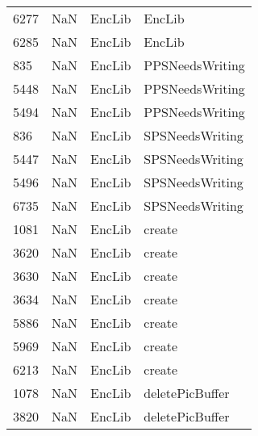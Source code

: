 \begin{tabular}{llll}
6277 &                   NaN &                     EncLib &                                    EncLib \\
6285 &                   NaN &                     EncLib &                                    EncLib \\
835  &                   NaN &                     EncLib &                           PPSNeedsWriting \\
5448 &                   NaN &                     EncLib &                           PPSNeedsWriting \\
5494 &                   NaN &                     EncLib &                           PPSNeedsWriting \\
836  &                   NaN &                     EncLib &                           SPSNeedsWriting \\
5447 &                   NaN &                     EncLib &                           SPSNeedsWriting \\
5496 &                   NaN &                     EncLib &                           SPSNeedsWriting \\
6735 &                   NaN &                     EncLib &                           SPSNeedsWriting \\
1081 &                   NaN &                     EncLib &                                    create \\
3620 &                   NaN &                     EncLib &                                    create \\
3630 &                   NaN &                     EncLib &                                    create \\
3634 &                   NaN &                     EncLib &                                    create \\
5886 &                   NaN &                     EncLib &                                    create \\
5969 &                   NaN &                     EncLib &                                    create \\
6213 &                   NaN &                     EncLib &                                    create \\
1078 &                   NaN &                     EncLib &                           deletePicBuffer \\
3820 &                   NaN &                     EncLib &                           deletePicBuffer \\

\end{tabular}
